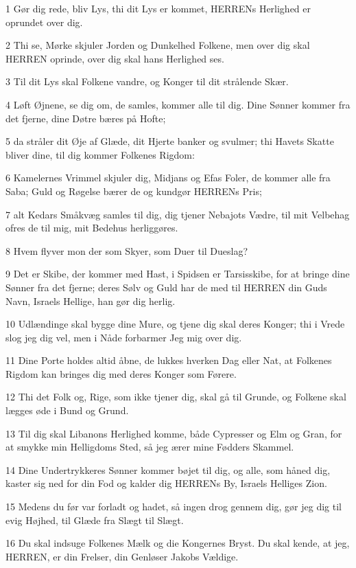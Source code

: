 \par 1 Gør dig rede, bliv Lys, thi dit Lys er kommet, HERRENs Herlighed er oprundet over dig.
\par 2 Thi se, Mørke skjuler Jorden og Dunkelhed Folkene, men over dig skal HERREN oprinde, over dig skal hans Herlighed ses.
\par 3 Til dit Lys skal Folkene vandre, og Konger til dit strålende Skær.
\par 4 Løft Øjnene, se dig om, de samles, kommer alle til dig. Dine Sønner kommer fra det fjerne, dine Døtre bæres på Hofte;
\par 5 da stråler dit Øje af Glæde, dit Hjerte banker og svulmer; thi Havets Skatte bliver dine, til dig kommer Folkenes Rigdom:
\par 6 Kamelernes Vrimmel skjuler dig, Midjans og Efas Foler, de kommer alle fra Saba; Guld og Røgelse bærer de og kundgør HERRENs Pris;
\par 7 alt Kedars Småkvæg samles til dig, dig tjener Nebajots Vædre, til mit Velbehag ofres de til mig, mit Bedehus herliggøres.
\par 8 Hvem flyver mon der som Skyer, som Duer til Dueslag?
\par 9 Det er Skibe, der kommer med Hast, i Spidsen er Tarsisskibe, for at bringe dine Sønner fra det fjerne; deres Sølv og Guld har de med til HERREN din Guds Navn, Israels Hellige, han gør dig herlig.
\par 10 Udlændinge skal bygge dine Mure, og tjene dig skal deres Konger; thi i Vrede slog jeg dig vel, men i Nåde forbarmer Jeg mig over dig.
\par 11 Dine Porte holdes altid åbne, de lukkes hverken Dag eller Nat, at Folkenes Rigdom kan bringes dig med deres Konger som Førere.
\par 12 Thi det Folk og, Rige, som ikke tjener dig, skal gå til Grunde, og Folkene skal lægges øde i Bund og Grund.
\par 13 Til dig skal Libanons Herlighed komme, både Cypresser og Elm og Gran, for at smykke min Helligdoms Sted, så jeg ærer mine Fødders Skammel.
\par 14 Dine Undertrykkeres Sønner kommer bøjet til dig, og alle, som håned dig, kaster sig ned for din Fod og kalder dig HERRENs By, Israels Helliges Zion.
\par 15 Medens du før var forladt og hadet, så ingen drog gennem dig, gør jeg dig til evig Højhed, til Glæde fra Slægt til Slægt.
\par 16 Du skal indsuge Folkenes Mælk og die Kongernes Bryst. Du skal kende, at jeg, HERREN, er din Frelser, din Genløser Jakobs Vældige.
